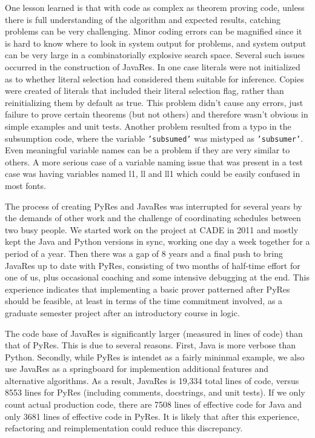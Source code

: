 \documentclass{llncs}
\begin{document}
One lesson learned is that with code as complex as theorem proving
code, unless there is full understanding of the algorithm and expected
results, catching problems can be very challenging.  Minor coding
errors can be magnified since it is hard to know where to look in
system output for problems, and system output can be very large in a
combinatorially explosive search space.  Several such issues occurred
in the construction of JavaRes.  In one case literals were not
initialized as to whether literal selection had considered them
suitable for inference.  Copies were created of literals that included
their literal selection flag, rather than reinitializing them by
default as true.  This problem didn't cause any errors, just failure
to prove certain theorems (but not others) and therefore wasn't
obvious in simple examples and unit tests.  Another problem resulted
from a typo in the subsumption code, where the variable
\texttt{'subsumed'} was mistyped as \texttt{'subsumer'}.  Even
meaningful variable names can be a problem if they are very similar to
others.  A more serious case of a variable naming issue that was
present in a test case was having variables named l1, ll and ll1 which
could be easily confused in most fonts.

The process of creating PyRes and JavaRes was interrupted for several
years by the demands of other work and the challenge of coordinating
schedules between two busy people.  We started work on the project at
CADE in 2011 and mostly kept the Java and Python versions in sync,
working one day a week together for a period of a year.  Then there was a gap of 8 years and
a final push to bring JavaRes up to date with PyRes, consisting of two
months of half-time effort for one of us, plus occasional coaching and
some intensive debugging at the end.  This experience indicates that
implementing a basic prover patterned after PyRes should be feasible,
at least in terms of the time commitment involved, as a
graduate semester project after an introductory course in logic.

The code base of JavaRes is significantly larger (measured in lines of
code) than that of PyRes. This is due to several reasons. First, Java
is more verbose than Python.
%
Secondly, while PyRes is intendet as a fairly mininmal example, we
also use JavaRes as a springboard for implemention additional features
and alternative algorithms.  As a result, JavaRes is 19,334 total
lines of code, versus 8553 lines for PyRes (including comments,
docstrings, and unit tests). If we only count actual production code,
there are 7508 lines of effective code for Java and only 3681 lines of
effective code in PyRes.  It is likely that after this experience,
refactoring and reimplementation could reduce this
discrepancy.
\end{document}

